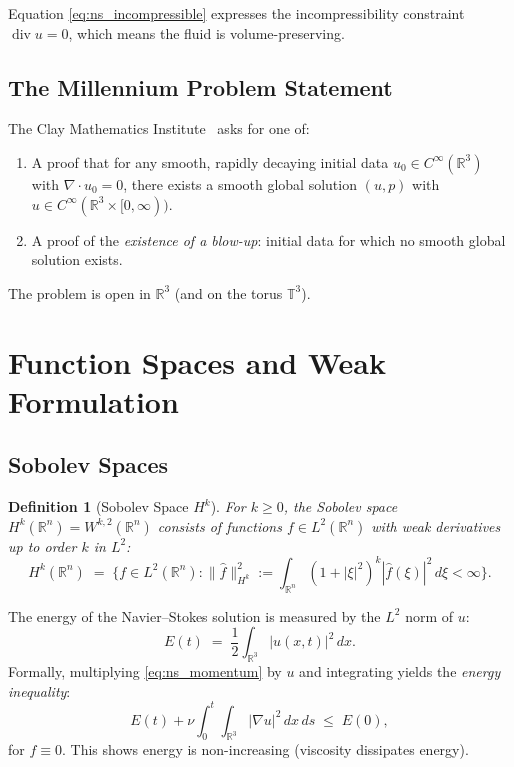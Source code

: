 \documentclass[12pt,a4paper]{article}
\newtheorem{definition}[theorem]{Definition}
\theoremstyle{remark}
\begin{document}
Equation \eqref{eq:ns_incompressible} expresses the incompressibility constraint
$\operatorname{div} u = 0$, which means the fluid is volume-preserving.

\subsection{The Millennium Problem Statement}

The Clay Mathematics Institute~\cite{Clay2000} asks for one of:
\begin{enumerate}[nosep]
  \item A proof that for any smooth, rapidly decaying initial data $u_0 \in C^\infty(\mathbb{R}^3)$
    with $\nabla \cdot u_0 = 0$, there exists a smooth global solution $(u, p)$ with
    $u \in C^\infty(\mathbb{R}^3 \times [0,\infty))$.
  \item A proof of the \emph{existence of a blow-up}: initial data for which no smooth
    global solution exists.
\end{enumerate}

The problem is open in $\mathbb{R}^3$ (and on the torus $\mathbb{T}^3$).

\section{Function Spaces and Weak Formulation}

\subsection{Sobolev Spaces}

\begin{definition}[Sobolev Space $H^k$]
  For $k \geq 0$, the Sobolev space $H^k(\mathbb{R}^n) = W^{k,2}(\mathbb{R}^n)$ consists
  of functions $f \in L^2(\mathbb{R}^n)$ with weak derivatives up to order $k$ in $L^2$:
  \[
    H^k(\mathbb{R}^n) \;=\; \bigl\{ f \in L^2(\mathbb{R}^n) :
    \|\hat{f}\|_{H^k}^2 := \int_{\mathbb{R}^n} (1+|\xi|^2)^k |\hat{f}(\xi)|^2\,d\xi < \infty \bigr\}.
  \]
\end{definition}

The energy of the Navier--Stokes solution is measured by the $L^2$ norm of $u$:
\[
  E(t) \;=\; \frac{1}{2}\int_{\mathbb{R}^3} |u(x,t)|^2\,dx.
\]
Formally, multiplying \eqref{eq:ns_momentum} by $u$ and integrating yields the
\emph{energy inequality}:
\begin{equation}\label{eq:energy}
  E(t) + \nu \int_0^t \int_{\mathbb{R}^3} |\nabla u|^2\,dx\,ds \;\leq\; E(0),
\end{equation}
for $f \equiv 0$.  This shows energy is non-increasing (viscosity dissipates energy).
\end{document}
